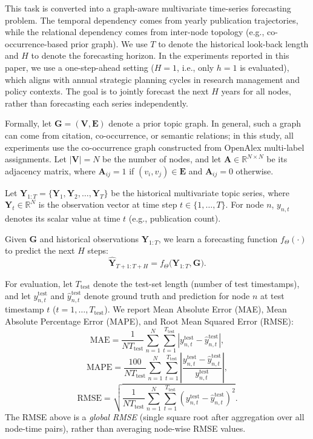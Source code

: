 \documentclass[runningheads]{llncs}
\begin{document}
This task is converted into a graph-aware multivariate time-series forecasting problem. The temporal dependency comes from yearly publication trajectories, while the relational dependency comes from inter-node topology (e.g., co-occurrence-based prior graph). We use $T$ to denote the historical look-back length and $H$ to denote the forecasting horizon. In the experiments reported in this paper, we use a one-step-ahead setting ($H=1$, i.e., only $h=1$ is evaluated), which aligns with annual strategic planning cycles in research management and policy contexts. The goal is to jointly forecast the next $H$ years for all nodes, rather than forecasting each series independently.

Formally, let $\mathbf{G}=(\mathbf{V},\mathbf{E})$ denote a prior topic graph. In general, such a graph can come from citation, co-occurrence, or semantic relations; in this study, all experiments use the co-occurrence graph constructed from OpenAlex multi-label assignments. Let $|\mathbf{V}|=N$ be the number of nodes, and let $\mathbf{A}\in\mathbb{R}^{N\times N}$ be its adjacency matrix, where $\mathbf{A}_{ij}=1$ if $(v_i,v_j)\in\mathbf{E}$ and $\mathbf{A}_{ij}=0$ otherwise.

Let $\mathbf{Y}_{1:T}=\{\mathbf{Y}_1,\mathbf{Y}_2,\ldots,\mathbf{Y}_T\}$ be the historical multivariate topic series, where $\mathbf{Y}_t\in\mathbb{R}^{N}$ is the observation vector at time step $t\in\{1,\ldots,T\}$. For node $n$, $y_{n,t}$ denotes its scalar value at time $t$ (e.g., publication count).

Given $\mathbf{G}$ and historical observations $\mathbf{Y}_{1:T}$, we learn a forecasting function $f_{\Theta}(\cdot)$ to predict the next $H$ steps:
\begin{equation}
\hat{\mathbf{Y}}_{T+1:T+H} = f_\Theta\bigl(\mathbf{Y}_{1:T},\mathbf{G}\bigr).
\end{equation}

For evaluation, let $T_{\text{test}}$ denote the test-set length (number of test timestamps), and let $y^{\text{test}}_{n,t}$ and $\hat{y}^{\text{test}}_{n,t}$ denote ground truth and prediction for node $n$ at test timestamp $t$ ($t=1,\ldots,T_{\text{test}}$). We report Mean Absolute Error (MAE), Mean Absolute Percentage Error (MAPE), and Root Mean Squared Error (RMSE):
\begin{equation}
\mathrm{MAE} = \frac{1}{N T_{\text{test}}}\sum_{n=1}^{N}\sum_{t=1}^{T_{\text{test}}}\left|y^{\text{test}}_{n,t}-\hat{y}^{\text{test}}_{n,t}\right|,
\end{equation}
\begin{equation}
\mathrm{MAPE} = \frac{100}{N T_{\text{test}}}\sum_{n=1}^{N}\sum_{t=1}^{T_{\text{test}}}\left|\frac{y^{\text{test}}_{n,t}-\hat{y}^{\text{test}}_{n,t}}{y^{\text{test}}_{n,t}}\right|,
\end{equation}
\begin{equation}
\mathrm{RMSE} = \sqrt{\frac{1}{N T_{\text{test}}}\sum_{n=1}^{N}\sum_{t=1}^{T_{\text{test}}}\left(y^{\text{test}}_{n,t}-\hat{y}^{\text{test}}_{n,t}\right)^2}.
\end{equation}
The RMSE above is a \emph{global RMSE} (single square root after aggregation over all node-time pairs), rather than averaging node-wise RMSE values.
\end{document}
